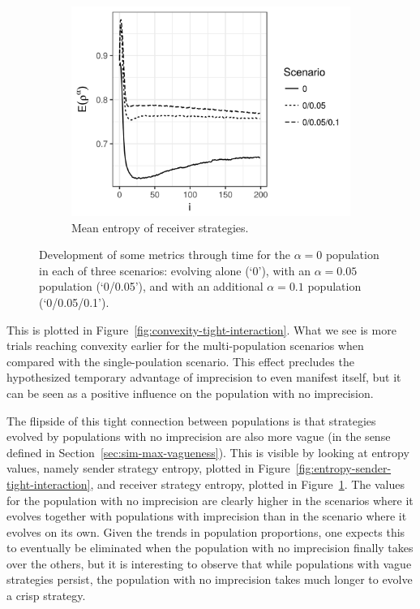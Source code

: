\documentclass[a4paper]{article}
\begin{document}
\begin{figure}
  \hfill
  \begin{subfigure}[]{0.32\textwidth}
    \includegraphics[width=\textwidth]{simulation/results/round-3/plots/entropy-receiver-all-strong.png}
    \caption{Mean entropy of receiver strategies.}
    \label{fig:entropy-receiver-tight-interaction}
  \end{subfigure}
  \caption{Development of some metrics through time for the $\alpha = 0$ population in each of three scenarios: evolving alone (`0'), with an $\alpha = 0.05$ population (`0/0.05'), and with an additional $\alpha = 0.1$ population (`0/0.05/0.1').}
  \label{fig:metrics-tight-interaction}
\end{figure}
This is plotted in Figure~\ref{fig:convexity-tight-interaction}.
What we see is more trials reaching convexity earlier for the multi-population scenarios when compared with the single-poulation scenario.
This effect precludes the hypothesized temporary advantage of imprecision to even manifest itself, but it can be seen as a positive influence on the population with no imprecision.

The flipside of this tight connection between populations is that strategies evolved by populations with no imprecision are also more vague (in the sense defined in Section~\ref{sec:sim-max-vagueness}).
This is visible by looking at entropy values, namely sender strategy entropy, plotted in Figure~\ref{fig:entropy-sender-tight-interaction}, and receiver strategy entropy, plotted in Figure~\ref{fig:entropy-receiver-tight-interaction}.
The values for the population with no imprecision are clearly higher in the scenarios where it evolves together with populations with imprecision than in the scenario where it evolves on its own.
Given the trends in population proportions, one expects this to eventually be eliminated when the population with no imprecision finally takes over the others, but it is interesting to observe that while populations with vague strategies persist, the population with no imprecision takes much longer to evolve a crisp strategy.
\end{document}
